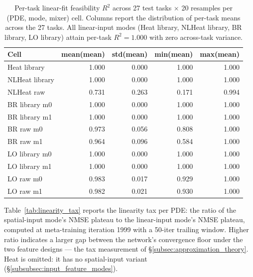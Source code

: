 \documentclass[10pt,journal,compsoc]{IEEEtran}
\begin{document}
\begin{table}[!t]
\centering
\caption{Per-task linear-fit feasibility $R^2$ across 27 test tasks
$\times$ 20 resamples per (PDE, mode, mixer) cell. Columns report the
distribution of per-task means across the 27 tasks. All linear-input
modes (Heat library, NLHeat library, BR library, LO library)
attain per-task $R^2 = 1.000$ with zero across-task variance.}
\label{tab:per_task_r2}
\small
\begin{tabular}{@{}lrrrr@{}}
\toprule
Cell                  & mean(mean) & std(mean) & min(mean) & max(mean) \\
\midrule
Heat library          & 1.000 & 0.000 & 1.000 & 1.000 \\
NLHeat library		  & 1.000 & 0.000 & 1.000 & 1.000 \\
NLHeat raw            & 0.731 & 0.263 & 0.171 & 0.994 \\
BR library m0         & 1.000 & 0.000 & 1.000 & 1.000 \\
BR library m1         & 1.000 & 0.000 & 1.000 & 1.000 \\
BR raw m0             & 0.973 & 0.056 & 0.808 & 1.000 \\
BR raw m1             & 0.964 & 0.096 & 0.584 & 1.000 \\
LO library m0         & 1.000 & 0.000 & 1.000 & 1.000 \\
LO library m1         & 1.000 & 0.000 & 1.000 & 1.000 \\
LO raw m0             & 0.983 & 0.017 & 0.929 & 1.000 \\
LO raw m1             & 0.982 & 0.021 & 0.930 & 1.000 \\
\bottomrule
\end{tabular}
\end{table}

Table~\ref{tab:linearity_tax} reports the linearity tax per PDE: the
ratio of the spatial-input mode's NMSE plateau to the linear-input
mode's NMSE plateau, computed at meta-training iteration 1999 with a
50-iter trailing window. Higher ratio indicates a larger gap between
the network's convergence floor under the two feature designs --- the
tax measurement of \S\ref{subsec:approximation_theory}. Heat is
omitted: it has no spatial-input variant
(\S\ref{subsubsec:input_feature_modes}).
\end{document}
